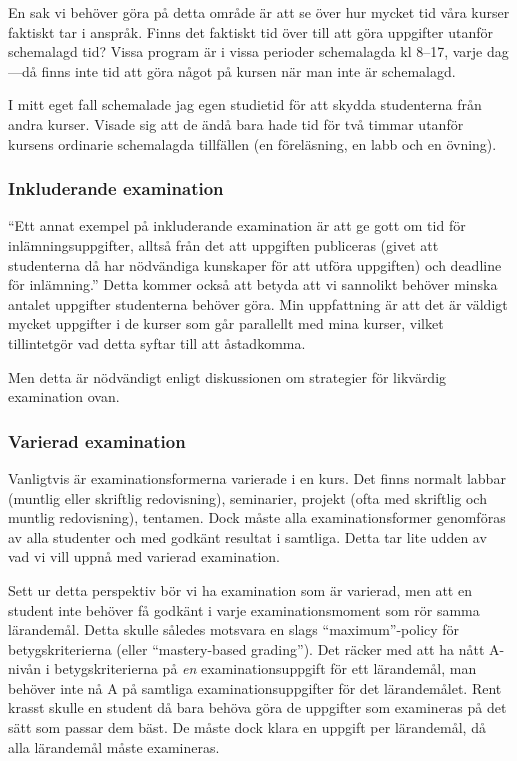 En sak vi behöver göra på detta område är att se över hur mycket tid
våra kurser faktiskt tar i anspråk. Finns det faktiskt tid över till att
göra uppgifter utanför schemalagd tid? Vissa program är i vissa perioder
schemalagda kl 8--17, varje dag---då finns inte tid att göra något på
kursen när man inte är schemalagd.

I mitt eget fall schemalade jag egen studietid för att skydda
studenterna från andra kurser. Visade sig att de ändå bara hade tid för
två timmar utanför kursens ordinarie schemalagda tillfällen (en
föreläsning, en labb och en övning).

\subsubsection{Inkluderande examination}\label{inkluderande-examination}

``Ett annat exempel på inkluderande examination är att ge gott om tid
för inlämningsuppgifter, alltså från det att uppgiften publiceras (givet
att studenterna då har nödvändiga kunskaper för att utföra uppgiften)
och deadline för inlämning.'' Detta kommer också att betyda att vi
sannolikt behöver minska antalet uppgifter studenterna behöver göra. Min
uppfattning är att det är väldigt mycket uppgifter i de kurser som går
parallellt med mina kurser, vilket tillintetgör vad detta syftar till
att åstadkomma.

Men detta är nödvändigt enligt diskussionen om strategier för likvärdig
examination ovan.

\subsubsection{Varierad examination}\label{varierad-examination}

Vanligtvis är examinationsformerna varierade i en kurs. Det finns
normalt labbar (muntlig eller skriftlig redovisning), seminarier,
projekt (ofta med skriftlig och muntlig redovisning), tentamen. Dock
måste alla examinationsformer genomföras av alla studenter och med
godkänt resultat i samtliga. Detta tar lite udden av vad vi vill uppnå
med varierad examination.

Sett ur detta perspektiv bör vi ha examination som är varierad, men att
en student inte behöver få godkänt i varje examinationsmoment som rör
samma lärandemål. Detta skulle således motsvara en slags
``maximum''-policy för betygskriterierna (eller ``mastery-based
grading''). Det räcker med att ha nått A-nivån i betygskriterierna på
\emph{en} examinationsuppgift för ett lärandemål, man behöver inte nå A
på samtliga examinationsuppgifter för det lärandemålet. Rent krasst
skulle en student då bara behöva göra de uppgifter som examineras på det
sätt som passar dem bäst. De måste dock klara en uppgift per lärandemål,
då alla lärandemål måste examineras.

